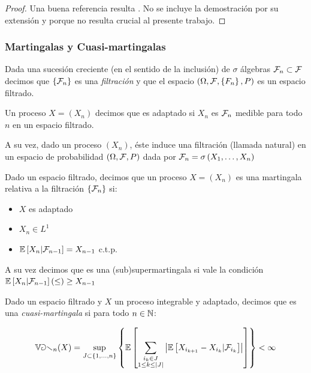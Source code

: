 \begin{proof}
	Una buena referencia resulta \cite{williams:1991}. No se incluye la demostraci\'on por su extensi\'on y porque no resulta crucial al presente trabajo.
\end{proof}

\subsubsection{Martingalas y Cuasi-martingalas}

\begin{definition}
	Dada una sucesi\'on creciente (en el sentido de la inclusi\'on) de $\sigma$ \'algebras $\mathcal{F}_n \subset \mathcal{F}$ decimos que $\left\lbrace\mathcal{F}_n\right\rbrace$ es una \textit{filtraci\'on} y que el espacio $\left(\Omega, \mathcal{F}, \left\lbrace F_n\right\rbrace, P\right)$ es un espacio filtrado.
	
	Un proceso $X  = \left(X_n\right)$ decimos que es adaptado si $X_n $ es $\mathcal{F}_n$ medible para todo $n$ en un espacio filtrado.
	
	A su vez, dado un proceso $\left(X_n\right)$, \'este induce una filtraci\'on (llamada natural) en un espacio de probabilidad $\left(\Omega, \mathcal{F}, P\right)$ dada por $\mathcal{F}_n = \sigma\left(X_1, \dots, X_n \right)$
	
\end{definition}

\begin{definition}
	Dado un espacio filtrado, decimos que un proceso $X = \left(X_n\right)$ es una martingala relativa a la filtraci\'on $\left\lbrace\mathcal{F}_n\right\rbrace$ si:
	
	\begin{itemize}
		\item $X$ es adaptado
		\item $X_n \in L^1$
		\item $\mathbb{E} \left[X_n \vert \mathcal{F}_{n-1}\right] = X_{n-1}$ c.t.p.
	\end{itemize}

	A su vez decimos que es una (sub)supermartingala si vale la condici\'on $\mathbb{E} \left[X_n \vert \mathcal{F}_{n-1}\right] (\leq)\geq X_{n-1}$
	
\end{definition}

\begin{definition}
	Dado un espacio filtrado y $X$ un proceso integrable y adaptado, decimos que es una \textit{cuasi-martingala} si para todo $n \in {\mathbb{N}}$:
	
	\begin{equation}
		\mathbb{Var}_n(X) = \sup\limits_{J \subset \left\lbrace1, \dots, n\right\rbrace} \left\lbrace\mathbb{E} \left[\sum\limits_{\substack{i_k \in J \\ 1 \leq k \leq \left\lvert J\right\rvert}}{\left\lvert\mathbb{E} \left[X_{i_{k+1}} - X_{i_k} \vert \mathcal{F}_{i_{k}}\right]\right\rvert}\right]\right\rbrace < \infty
	\end{equation}
	
\end{definition}

